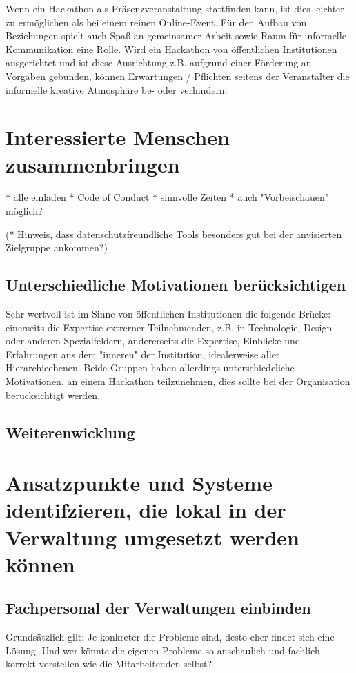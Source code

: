 Wenn ein Hackathon als Präsenzveranstaltung stattfinden kann, ist dies leichter zu ermöglichen als bei einem reinen Online-Event. Für den Aufbau von Beziehungen spielt auch Spaß an gemeinsamer Arbeit sowie Raum für informelle Kommunikation eine Rolle. Wird ein Hackathon von öffentlichen Institutionen ausgerichtet und ist diese Ausrichtung z.B. aufgrund einer Förderung an Vorgaben gebunden, können Erwartungen / Pflichten seitens der Veranstalter die informelle kreative Atmosphäre be- oder verhindern.

\section{Interessierte Menschen zusammenbringen}

* alle einladen
* Code of Conduct
* sinnvolle Zeiten
* auch "Vorbeischauen" möglich?

(* Hinweis, dass datenschutzfreundliche Tools besonders gut bei der anvisierten Zielgruppe ankommen?)

\subsection{Unterschiedliche Motivationen berücksichtigen}

Sehr wertvoll ist im Sinne von öffentlichen Institutionen die folgende Brücke: einerseits die Expertise extrerner Teilnehmenden, z.B. in Technologie, Design oder anderen Spezialfeldern, andererseits die Expertise, Einblicke und Erfahrungen aus dem "inneren" der Institution, idealerweise aller Hierarchieebenen. Beide Gruppen haben allerdings unterschiedeliche Motivationen, an einem Hackathon teilzunehmen, dies sollte bei der Organisation berücksichtigt werden.

\subsection{Weiterenwicklung}


\section{Ansatzpunkte und Systeme identifzieren, die lokal in der Verwaltung umgesetzt werden können}

\subsection{Fachpersonal der Verwaltungen einbinden}
Grundsätzlich gilt: Je konkreter die Probleme sind, desto eher findet sich eine Lösung. Und wer könnte die eigenen Probleme so anschaulich und fachlich korrekt vorstellen wie die Mitarbeitenden selbst?

